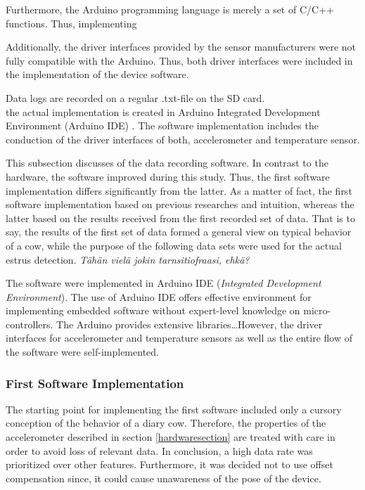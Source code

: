 \documentclass[english,12pt,a4paper,pdftex,elec,utf8]{aaltothesis}
\begin{document}
Furthermore, the Arduino programming language is merely a set of C/C++ functions. Thus, implementing 

Additionally, the driver interfaces provided by the sensor manufacturers were not fully compatible with the Arduino. Thus, both driver interfaces were included in the implementation of the device software. 

Data logs are recorded on a regular .txt-file on the SD card.\\

the actual implementation is created in Arduino Integrated Development Environment (Arduino IDE) \cite{arduinoide}. The software implementation includes the conduction of the driver interfaces of both, accelerometer and temperature sensor.


This subsection discusses of the data recording software. In contrast to the hardware, the software improved during this study. Thus, the first software implementation differs significantly from the latter. As a matter of fact, the first software implementation based on previous researches and intuition, whereas the latter based on the results received from the first recorded set of data. That is to say, the results of the first set of data formed a general view on typical behavior of a cow, while the purpose of the following data sets were used for the actual estrus detection. \textit{Tähän vielä jokin tarnsitiofraasi, ehkä?}

The software were implemented in Arduino IDE (\textit{Integrated Development Environment}). The use of Arduino IDE offers effective environment for implementing embedded software without expert-level knowledge on micro-controllers. The Arduino provides extensive libraries\dots However, the driver interfaces for accelerometer and temperature sensors as well as the entire flow of the software were self-implemented.



\subsubsection*{First Software Implementation}\label{firstdatasetconfigurations}




The starting point for implementing the first software included only a cursory conception of the behavior of a diary cow. Therefore, the properties of the accelerometer described in section \ref{hardwaresection} are treated with care in order to avoid loss of relevant data. In conclusion, a high data rate was prioritized over other features. Furthermore, it was decided not to use offset compensation since, it could cause unawareness of the pose of the device. 
\end{document}
